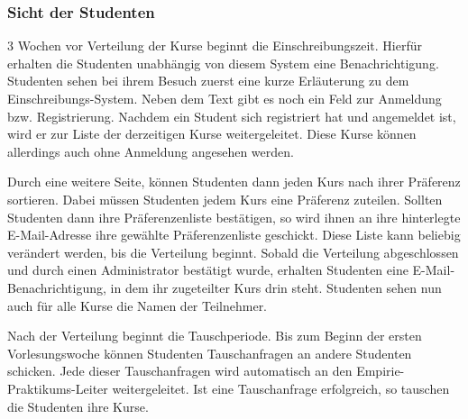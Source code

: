 \documentclass[12pt,a4paper]{article}
\begin{document}
            \subsubsection{Sicht der Studenten}
            3 Wochen vor Verteilung der Kurse beginnt die Einschreibungszeit. Hierfür erhalten die Studenten unabhängig von diesem System eine Benachrichtigung.
            Studenten sehen bei ihrem Besuch zuerst eine kurze Erläuterung zu dem Einschreibungs-System. Neben dem Text gibt es noch ein Feld zur Anmeldung bzw. Registrierung.
            Nachdem ein Student sich registriert hat und angemeldet ist, wird er zur Liste der derzeitigen Kurse weitergeleitet. Diese Kurse können allerdings auch ohne Anmeldung angesehen werden. %
            
            Durch eine weitere Seite, können Studenten dann jeden Kurs nach ihrer Präferenz sortieren. Dabei müssen Studenten jedem Kurs eine Präferenz zuteilen. Sollten Studenten dann ihre Präferenzenliste bestätigen, so wird ihnen an ihre hinterlegte E-Mail-Adresse ihre gewählte Präferenzenliste geschickt. Diese Liste kann beliebig verändert werden, bis die Verteilung beginnt. %
            Sobald die Verteilung abgeschlossen und durch einen Administrator bestätigt wurde, erhalten Studenten eine E-Mail-Benachrichtigung, in dem ihr zugeteilter Kurs drin steht.
            Studenten sehen nun auch für alle Kurse die Namen der Teilnehmer.
            
            Nach der Verteilung beginnt die Tauschperiode. Bis zum Beginn der ersten Vorlesungswoche können Studenten Tauschanfragen an andere Studenten schicken. Jede dieser Tauschanfragen wird automatisch an den Empirie-Praktikums-Leiter weitergeleitet.
            Ist eine Tauschanfrage erfolgreich, so tauschen die Studenten ihre Kurse.
    
\end{document}
